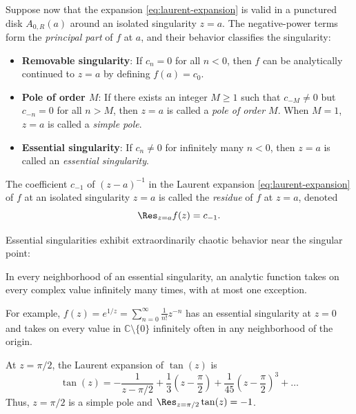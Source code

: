 Suppose now that the expansion \eqref{eq:laurent-expansion} is valid in a punctured disk \(A_{0, R}(a)\) around an isolated singularity \(z = a\).
The negative-power terms form the \emph{principal part} of \(f\) at \(a\), and their behavior classifies the singularity:
\begin{itemize}
    \item \textbf{Removable singularity}: If \(c_n = 0\) for all \(n < 0\), then \(f\) can be analytically continued to \(z = a\) by defining \(f(a) = c_0\).
    \item \textbf{Pole of order \(M\)}: If there exists an integer \(M \ge 1\) such that \(c_{-M} \neq 0\) but \(c_{-n} = 0\) for all \(n > M\), then \(z = a\) is called a \emph{pole of order \(M\)}.
    When \(M = 1\), \(z = a\) is called a \emph{simple pole}.
    \item \textbf{Essential singularity}: If \(c_n \neq 0\) for infinitely many \(n < 0\), then \(z = a\) is called an \emph{essential singularity}.
\end{itemize}

\begin{definition}
    The coefficient \(c_{-1}\) of \((z - a)^{-1}\) in the Laurent expansion \eqref{eq:laurent-expansion} of \(f\) at an isolated singularity \(z = a\) is called the \emph{residue} of \(f\) at \(z = a\), denoted
    \[
        \Res_{z=a} f(z) = c_{-1}.
    \]
\end{definition}

Essential singularities exhibit extraordinarily chaotic behavior near the singular point:

\begin{theorem}
    In every neighborhood of an essential singularity, an analytic function takes on every complex value infinitely many times, with at most one exception.
\end{theorem}

For example, \(f(z) = e^{1/z} = \sum_{n=0}^{\infty} \frac{1}{n!} z^{-n}\) has an essential singularity at \(z = 0\) and takes on every value in \(\mathbb{C} \setminus \{0\}\) infinitely often in any neighborhood of the origin.

\begin{example}
    At \(z = \pi/2\), the Laurent expansion of \(\tan(z)\) is
    \[
        \tan(z) = -\frac{1}{z - \pi/2} + \frac{1}{3}\left( z - \frac{\pi}{2} \right) + \frac{1}{45}\left( z - \frac{\pi}{2} \right)^3 + \dots
    \]
    Thus, \(z = \pi/2\) is a simple pole and \(\Res_{z=\pi/2} \tan(z) = -1\).
\end{example}


